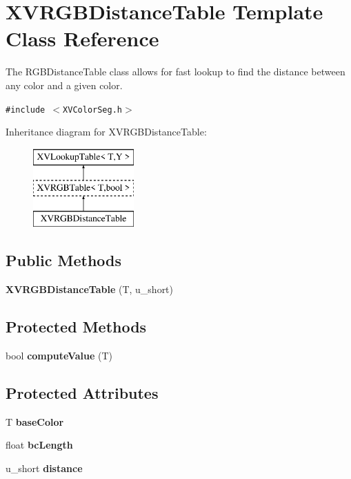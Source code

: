 \hypertarget{class_XVRGBDistanceTable}{
\section{XVRGBDistance\-Table  Template Class Reference}
\label{XVRGBDistanceTable}
}
The RGBDistance\-Table class allows for fast lookup to find the distance between any color and a given color. 


{\tt \#include $<$XVColor\-Seg.h$>$}

Inheritance diagram for XVRGBDistance\-Table:\begin{figure}[H]
\begin{center}
\leavevmode
\includegraphics[height=3cm]{class_XVRGBDistanceTable}
\end{center}
\end{figure}
\subsection*{Public Methods}
\begin{CompactItemize}
\item 
\label{XVRGBDistanceTable_a0}
\hypertarget{class_XVRGBDistanceTable_a0}{
{\bf XVRGBDistance\-Table} (T, u\_\-short)}

\end{CompactItemize}
\subsection*{Protected Methods}
\begin{CompactItemize}
\item 
\label{XVRGBDistanceTable_b0}
\hypertarget{class_XVRGBDistanceTable_b0}{
bool {\bf compute\-Value} (T)}

\end{CompactItemize}
\subsection*{Protected Attributes}
\begin{CompactItemize}
\item 
T {\bf base\-Color}
\item 
float {\bf bc\-Length}
\item 
u\_\-short {\bf distance}
\end{CompactItemize}


